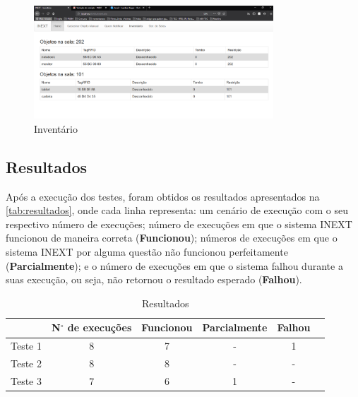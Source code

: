 \begin{figure}[htb]
      \caption{\label{fig:invent}{Inventário}}
      \centering
      \includegraphics[width=0.8\textwidth]{Figuras/execution5d.png}
\end{figure}

\subsection{Resultados}

Após a execução dos testes, foram obtidos os resultados apresentados na \autoref{tab:resultados}, onde cada linha representa: um cenário de execução com o seu respectivo número de execuções; número de execuções em que o sistema INEXT funcionou de maneira correta (\textbf{Funcionou}); números de execuções em que o sistema INEXT por alguma questão não funcionou perfeitamente (\textbf{Parcialmente}); e o número de execuções em que o sistema falhou durante a suas execução, ou seja, não retornou o resultado esperado (\textbf{Falhou}).


\begin{table}[ht]
  \centering
  \caption{Resultados}
  \label{tab:resultados}
  \begin{tabular}{|c|c|c|c|c|c|}
     \hline
    & \textbf{N$^{\circ}$ de execuções} & \textbf{Funcionou} & \textbf{Parcialmente} & \textbf{Falhou} \\
    \hline
    Teste 1 & 8 & 7 & - & 1\\
    \hline
    Teste 2 & 8 & 8 & - & -\\
    \hline
    Teste 3 & 7 & 6 & 1 & -\\
    \hline

  \end{tabular}
\end{table}

